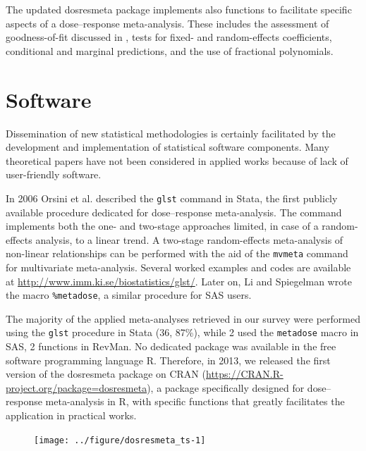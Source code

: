 \documentclass[11pt,a4paper,twoside,openany]{book}\usepackage{knitr}
\newcommand{\pkg}[1]{{\fontseries{b}\selectfont #1}}
\begin{document}
{\noindent The updated \pkg{dosresmeta} package implements also functions to facilitate specific aspects of a dose--response meta-analysis. These includes the assessment of goodness-of-fit discussed in , tests for fixed- and random-effects coefficients, conditional and marginal predictions, and the use of fractional polynomials.



\section{Software}

Dissemination of new statistical methodologies is certainly facilitated by the development and implementation of statistical software components. Many theoretical papers have not been considered in applied works because of lack of user-friendly software. 

\noindent In 2006 Orsini et al. described the \texttt{glst} command in Stata, the first publicly available procedure dedicated for dose--response meta-analysis. The command implements both the one- and two-stage approaches limited, in case of a random-effects analysis, to a linear trend. A two-stage random-effects meta-analysis of non-linear relationships can be performed with the aid of the \texttt{mvmeta} command for multivariate meta-analysis. Several worked examples and codes are available at \url{http://www.imm.ki.se/biostatistics/glst/}. Later on, Li and Spiegelman wrote the macro \texttt{\%metadose}, a similar procedure for SAS users.
 
The majority of the applied meta-analyses retrieved in our survey were performed using the \texttt{glst} procedure in Stata (36, 87\%), while 2 used the \texttt{metadose} macro in SAS, 2 functions in RevMan. No dedicated package was available in the free software programming language \textsf{R}. Therefore, in 2013, we released the first version of the \pkg{dosresmeta} package on CRAN (\url{https://CRAN.R-project.org/package=dosresmeta}), a package specifically designed for dose--response meta-analysis in \textsf{R}, with specific functions that greatly facilitates the application in practical works. 

\begin{knitrout}\footnotesize
{}\color{fgcolor}\begin{figure}[ht!]

{\centering \texttt{[image: ../figure/dosresmeta\_ts-1]} 

}
\end{figure}
\end{knitrout}}
\end{document}
